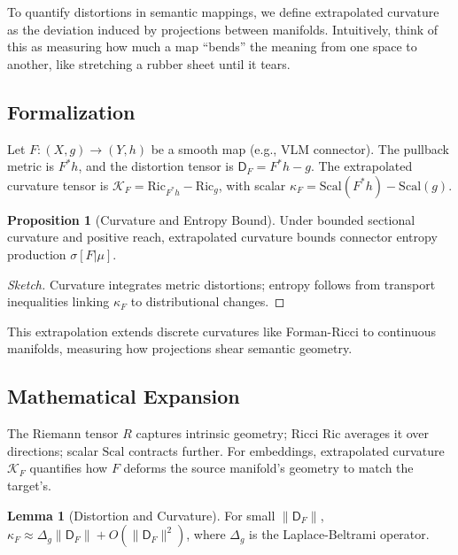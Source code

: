 \documentclass{article}
\theoremstyle{definition}
\newtheorem{lemma}[theorem]{Lemma}
\newtheorem{proposition}[theorem]{Proposition}
\begin{document}
To quantify distortions in semantic mappings, we define extrapolated curvature as the deviation induced by projections between manifolds. Intuitively, think of this as measuring how much a map ``bends'' the meaning from one space to another, like stretching a rubber sheet until it tears.

\subsection{Formalization}

Let $F: (X, g) \to (Y, h)$ be a smooth map (e.g., VLM connector). The pullback metric is $F^* h$, and the distortion tensor is $\mathsf{D}_F = F^* h - g$. The extrapolated curvature tensor is $\mathcal{K}_F = \mathrm{Ric}_{F^* h} - \mathrm{Ric}_g$, with scalar $\kappa_F = \mathrm{Scal}(F^* h) - \mathrm{Scal}(g)$.

\begin{proposition}[Curvature and Entropy Bound]
Under bounded sectional curvature and positive reach, extrapolated curvature bounds connector entropy production $\sigma[F|\mu]$.
\end{proposition}

\begin{proof}[Sketch]
Curvature integrates metric distortions; entropy follows from transport inequalities linking $\kappa_F$ to distributional changes.
\end{proof}

This extrapolation extends discrete curvatures like Forman-Ricci \cite{forman2003bochner} to continuous manifolds, measuring how projections shear semantic geometry.

\subsection{Mathematical Expansion}

The Riemann tensor $R$ captures intrinsic geometry; Ricci $\mathrm{Ric}$ averages it over directions; scalar $\mathrm{Scal}$ contracts further. For embeddings, extrapolated curvature $\mathcal{K}_F$ quantifies how $F$ deforms the source manifold's geometry to match the target's.

\begin{lemma}[Distortion and Curvature]
For small $\|\mathsf{D}_F\|$, $\kappa_F \approx \Delta_g \|\mathsf{D}_F\| + O(\|\mathsf{D}_F\|^2)$, where $\Delta_g$ is the Laplace-Beltrami operator.
\end{lemma}
\end{document}
